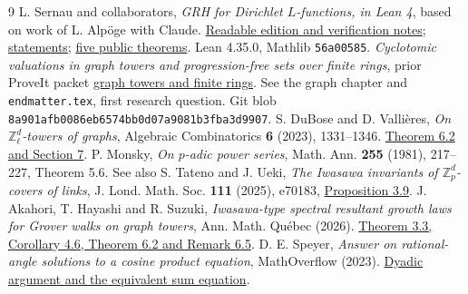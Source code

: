 \documentclass[11pt,letterpaper]{article}
\newcommand{\Z}{\mathbb Z}\newcommand{\Q}{\mathbb Q}\newcommand{\F}{\mathbb F}
\newcommand{\leanfile}[2]{\href{https://github.com/lsernau/grh-lean/blob/72fead102f663d5c7a407964a13dc0cf9d977207/grh/src/#1}{#2}}
\begin{document}
\begin{thebibliography}{9}\small
{} L. Sernau and collaborators, \emph{GRH for Dirichlet $L$-functions, in Lean 4}, based on work of L. Alpöge with Claude.
\href{https://github.com/lsernau/grh-lean/tree/72fead102f663d5c7a407964a13dc0cf9d977207/grh}{Readable edition and verification notes};
\leanfile{Statements.lean}{statements};
\leanfile{Main.lean}{five public theorems}. Lean 4.35.0, Mathlib \texttt{56a00585}.
 \emph{Cyclotomic valuations in graph towers and progression-free sets over finite rings}, prior ProveIt packet
\href{https://github.com/VladimirReshetnikov/ProveIt/blob/1667e16cee9d4a68961e201e7288b8ecdac895c6/docs/incoming/grh_method_transfers_graph_towers_and_finite_rings.zip}{graph towers and finite rings}. See the graph chapter and \texttt{endmatter.tex}, first research question. Git blob \texttt{8a901afb0086eb6574bb0d07a9081b3fba3d9907}.
 S. DuBose and D. Vallières, \emph{On $\Z_\ell^d$-towers of graphs}, Algebraic Combinatorics \textbf{6} (2023), 1331--1346. \href{https://doi.org/10.5802/alco.304}{Theorem 6.2 and Section 7}.
 P. Monsky, \emph{On $p$-adic power series}, Math. Ann. \textbf{255} (1981), 217--227, Theorem 5.6. See also S. Tateno and J. Ueki, \emph{The Iwasawa invariants of $\Z_p^d$-covers of links}, J. Lond. Math. Soc. \textbf{111} (2025), e70183, \href{https://doi.org/10.1112/jlms.70183}{Proposition 3.9}.
 J. Akahori, T. Hayashi and R. Suzuki, \emph{Iwasawa-type spectral resultant growth laws for Grover walks on graph towers}, Ann. Math. Québec (2026). \href{https://doi.org/10.1007/s40316-026-00290-1}{Theorem 3.3, Corollary 4.6, Theorem 6.2 and Remark 6.5}.
 D. E. Speyer, \emph{Answer on rational-angle solutions to a cosine product equation}, MathOverflow (2023). \href{https://mathoverflow.net/questions/458827}{Dyadic argument and the equivalent sum equation}.
\end{thebibliography}
\end{document}

